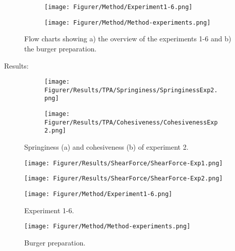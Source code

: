 
\begin{figure}[H]
\captionsetup[subfigure]{justification=Centering}

\begin{subfigure}[t]{0.35\textwidth}
    \texttt{[image: Figurer/Method/Experiment1-6.png]}
    \caption{}
\end{subfigure}\hspace{\fill} %
\begin{subfigure}[t]{0.6\textwidth}
    \texttt{[image: Figurer/Method/Method-experiments.png]}
    \caption{}
\end{subfigure}
\caption{Flow charts showing a) the overview of the experiments 1-6 and b) the burger preparation.}
\label{fig:Method:FlowChart}
\end{figure}


Results:

\begin{figure}
\begin{subfigure}{.5\textwidth}
  \centering
  \texttt{[image: Figurer/Results/TPA/Springiness/SpringinessExp2.png]}
  \caption{}
  \label{fig:TPA:Springiness:Exp2}
\end{subfigure}%
\begin{subfigure}{.5\textwidth}
  \centering
  \texttt{[image: Figurer/Results/TPA/Cohesiveness/CohesivenessExp2.png]}
  \caption{}
  \label{fig:TPA:Cohesiveness:Exp2}
\end{subfigure}
\caption{Springiness (a) and cohesiveness (b) of experiment 2.}
\label{fig:fig}
\end{figure}

\begin{figure}[H]
    \centering
    \begin{floatrow}
    \captionsetup{justification=raggedright,
    singlelinecheck=false}
    
      {\texttt{[image: Figurer/Results/ShearForce/ShearForce-Exp1.png]}}

      {\texttt{[image: Figurer/Results/ShearForce/ShearForce-Exp2.png]}}
    \end{floatrow}
\end{figure}

\begin{figure}
    \centering
    \texttt{[image: Figurer/Method/Experiment1-6.png]}
    \caption{Experiment 1-6.}
    \label{fig:Method:Experiment1-6}
\end{figure}
\begin{figure}
    \centering
    \texttt{[image: Figurer/Method/Method-experiments.png]}
    \caption{Burger preparation.}
    \label{fig:Method:BurgerPreparation}
\end{figure}

